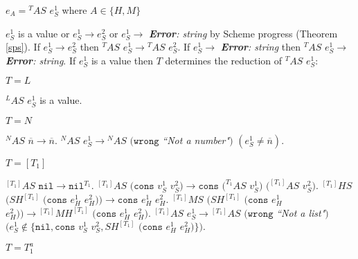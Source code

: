 \begin{case}

$e_{A}={^{T}A}S$ $e_{S}^{1}$ where $A\in\lbrace H,M\rbrace$

$e_{S}^{1}$ is a value or $e_{S}^{1}\rightarrow e_{S}^{2}$ or $e_{S}^{1}\rightarrow$ \emph{\textbf{Error}: string} by Scheme progress (Theorem \ref{sps}).  If $e_{S}^{1}\rightarrow e_{S}^{2}$ then $^{T}AS$ $e_{S}^{1}\rightarrow{^{T}A}S$ $e_{S}^{2}$.  If $e_{S}^{1}\rightarrow$ \emph{\textbf{Error}: string} then $^{T}AS$ $e_{S}^{1}\rightarrow$ \emph{\textbf{Error}: string}.  If $e_{S}^{1}$ is a value then $T$ determines the reduction of $^{T}AS$ $e_{S}^{1}$:

\begin{subcase}

$T=L$

$^{L}AS$ $e_{S}^{1}$ is a value.

\end{subcase}

\begin{subcase}

$T=N$

$^{N}AS$ $\overline{n}\rightarrow\overline{n}$.  $^{N}AS$ $e_{S}^{1}\rightarrow{^{N}A}S$ $(\mathtt{wrong}$ \emph{``Not a number"}$)$ $(e_{S}^{1}\neq\overline{n})$.

\end{subcase}

\begin{subcase}

$T=[T_{1}]$

$^{[T_{1}]}AS$ $\mathtt{nil}\rightarrow\mathtt{nil}^{T_{1}}$.  $^{[T_{1}]}AS$ $(\mathtt{cons}$ $v_{S}^{1}$ $v_{S}^{2})\rightarrow\mathtt{cons}$ $(^{T_{1}}AS$ $v_{S}^{1})$ $(^{[T_{1}]}AS$ $v_{S}^{2})$.  $^{[T_{1}]}HS$ $(SH^{[T_{1}]}$ $(\mathtt{cons}$ $e_{H}^{1}$ $e_{H}^{2}))\rightarrow\mathtt{cons}$ $e_{H}^{1}$ $e_{H}^{2}$.  $^{[T_{1}]}MS$ $(SH^{[T_{1}]}$ $(\mathtt{cons}$ $e_{H}^{1}$ $e_{H}^{2}))\rightarrow{^{[T_{1}]}M}H^{[T_{1}]}$ $(\mathtt{cons}$ $e_{H}^{1}$ $e_{H}^{2})$.  $^{[T_{1}]}AS$ $e_{S}^{1}\rightarrow{^{[T_{1}]}A}S$ $(\mathtt{wrong}$ \emph{``Not a list"}$)$ $(e_{S}^{1}\not\in\lbrace\mathtt{nil},\mathtt{cons}$ $v_{S}^{1}$ $v_{S}^{2},SH^{[T_{1}]}$ $(\mathtt{cons}$ $e_{H}^{1}$ $e_{H}^{2})\rbrace)$.

\end{subcase}

\begin{subcase}

$T=T_{1}^{a}$


\end{subcase}
\end{case}
